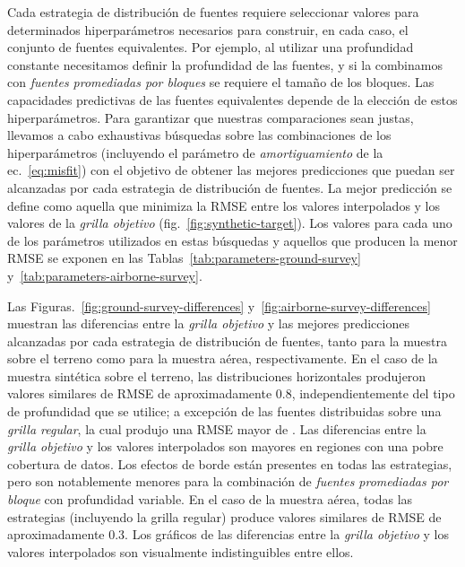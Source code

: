 Cada estrategia de distribución de fuentes requiere seleccionar valores para
determinados hiperparámetros necesarios para construir, en cada caso, el
conjunto de fuentes equivalentes.
Por ejemplo, al utilizar una profundidad constante necesitamos definir la
profundidad de las fuentes, y si la combinamos con \emph{fuentes promediadas
por bloques} se requiere el tamaño de los bloques.
Las capacidades predictivas de las fuentes equivalentes depende de la elección
de estos hiperparámetros.
Para garantizar que nuestras comparaciones sean justas, llevamos a cabo
exhaustivas búsquedas sobre las combinaciones de los hiperparámetros
(incluyendo el parámetro de \emph{amortiguamiento} de la ec.~\ref{eq:misfit})
con el objetivo de obtener las mejores predicciones que puedan ser alcanzadas
por cada estrategia de distribución de fuentes.
La mejor predicción se define como aquella que minimiza la \ac{RMSE} entre los
valores interpolados y los valores de la \emph{grilla objetivo}
(fig.~\ref{fig:synthetic-target}).
Los valores para cada uno de los parámetros utilizados en estas búsquedas
y aquellos que producen la menor \ac{RMSE} se exponen en las
Tablas~\ref{tab:parameters-ground-survey}
y~\ref{tab:parameters-airborne-survey}.

Las Figuras.~\ref{fig:ground-survey-differences}
y~\ref{fig:airborne-survey-differences}
muestran las diferencias entre la \emph{grilla objetivo} y las mejores
predicciones alcanzadas por cada estrategia de distribución de fuentes, tanto
para la muestra sobre el terreno como para la muestra aérea, respectivamente.
En el caso de la muestra sintética sobre el terreno, las distribuciones
horizontales produjeron valores similares de \ac{RMSE} de aproximadamente
0.8\mGal{}, independientemente del tipo de profundidad que se utilice;
a excepción de las fuentes distribuidas sobre una \emph{grilla regular}, la
cual produjo una \ac{RMSE} mayor de
\BestGroundGridSourcesConstantDepthRms{}\mGal{}.
Las diferencias entre la \emph{grilla objetivo} y los valores interpolados son
mayores en regiones con una pobre cobertura de datos.
Los efectos de borde están presentes en todas las estrategias, pero son
notablemente menores para la combinación de \emph{fuentes promediadas por
bloque} con profundidad variable.
En el caso de la muestra aérea, todas las estrategias (incluyendo la grilla
regular) produce valores similares de \ac{RMSE} de aproximadamente 0.3\mGal{}.
Los gráficos de las diferencias entre la \emph{grilla objetivo} y los valores
interpolados son visualmente indistinguibles entre ellos.

